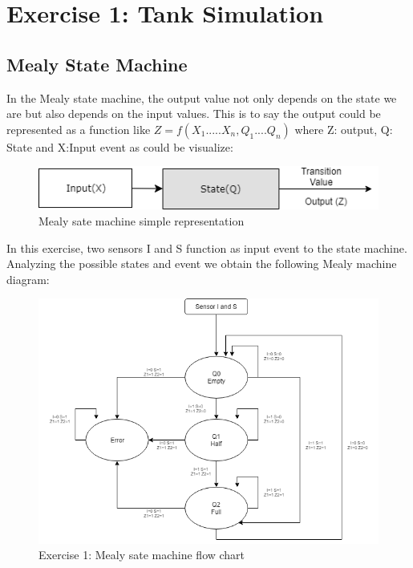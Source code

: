 %

%

%
%
%


\section{\color{olive}Exercise 1: Tank Simulation}

\subsection{\color{purple}Mealy State Machine}

In the Mealy state machine, the output value not only depends on the state we are but also depends on the input values. This is to say the output could be represented as a function like $Z=f(X_1.....X_n,Q_1....Q_n)$ where Z: output, Q: State and X:Input event as could be visualize:

 \begin{figure}[h!]
        \centering
        \includegraphics[scale=0.75]{../Exercise1/Mealy/mealydiagram.png}
        \caption{\color{cyan}Mealy sate machine simple representation}
        \label{fig:ej1mealyr}
    \end{figure}

In this exercise, two sensors I and S function as input event to the state machine. Analyzing the possible states and event we obtain the following Mealy machine diagram:

 \begin{figure}[h!]
        \centering
        \includegraphics[scale=0.65]{../Exercise1/Mealy/ej1mealy.png}
        \caption{\color{cyan}Exercise 1: Mealy sate machine flow chart}
        \label{fig:ej1mealyd}
    \end{figure}

